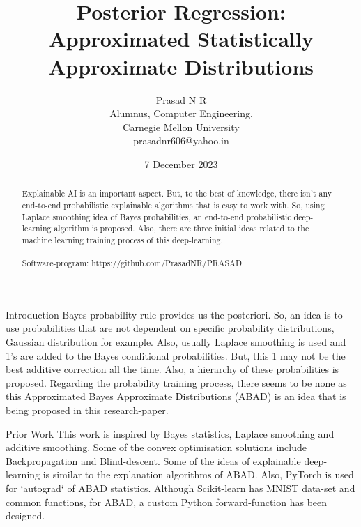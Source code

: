 \documentclass{article}
\title{Posterior Regression: Approximated Statistically Approximate Distributions}
\author{Prasad N R\\Alumnus, Computer Engineering, \\Carnegie Mellon University\\prasadnr606@yahoo.in}
\date{7 December 2023}
\begin{document}
	\maketitle 
	\begin{abstract}
		Explainable AI is an important aspect. But, to the best of knowledge, there isn't any end-to-end probabilistic explainable algorithms that is easy to work with. So, using Laplace smoothing idea of Bayes probabilities, an end-to-end probabilistic deep-learning algorithm is proposed. Also, there are three initial ideas related to the machine learning training process of this deep-learning.\\\\
		Software-program: https://github.com/PrasadNR/PRASAD
	\end{abstract}
	
	\begin{section}{Introduction}
		Bayes probability rule provides us the posteriori. So, an idea is to use probabilities that are not dependent on specific probability distributions, Gaussian distribution for example. Also, usually Laplace smoothing is used and 1's are added to the Bayes conditional probabilities. But, this 1 may not be the best additive correction all the time. Also, a hierarchy of these probabilities is proposed. Regarding the probability training process, there seems to be none as this Approximated Bayes Approximate Distributions (ABAD) is an idea that is being proposed in this research-paper. 
	\end{section}
	
	\begin{section}{Prior Work}
		This work is inspired by Bayes statistics, Laplace smoothing and additive smoothing. Some of the convex optimisation solutions include Backpropagation and Blind-descent.\cite{hinton}\cite{blindDescent} Some of the ideas of explainable deep-learning is similar to the explanation algorithms of ABAD.\cite{explainableDeepLearning} Also, PyTorch is used for `autograd` of ABAD statistics.\cite{PyTorch} Although Scikit-learn has MNIST data-set and common functions, for ABAD, a custom Python forward-function has been designed.\cite{scikit-learn}
	\end{section}
	
\end{document}
